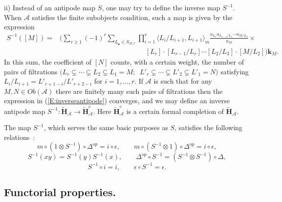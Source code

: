 \documentclass[a4paper,10pt]{amsart}
\def\H{\mathbf{H}}
\def\A{\mathcal{A}}
\numberwithin{equation}{section}
\begin{document}
\noindent
ii) Instead of an antipode map $S$, one may try to define the inverse map $S^{-1}$. When $\mathcal{A}$ satisfies the finite subobjects condition, such a map is given by the expression
\begin{equation}\label{E:inverseantipode}
\begin{split}
S^{-1}([M])=&\bigg( \sum_{r \geq 1} (-1)^r \sum_{\underline{L}_{\bullet} \in S_{M,r}} \prod_{i=1}^r \langle L_i/L_{i+1}, L_{i+1} \rangle_m \frac{a_{L_r} a_{L_{r-1}/L_r} \cdots a_{M/L_2}}{a_M} \times \\
&\qquad \qquad \qquad \qquad \qquad \qquad \; \;  [L_r] \cdot [L_{r-1}/L_r]  \cdots [L_2/L_3] \cdot [M/L_2] \bigg)\mathbf{k}_{M}.
\end{split}
\end{equation}
In this sum, the coefficient of $[N]$ counts, with a certain weight, the number of pairs of filtrations
$ \big( L_r \subsetneq \cdots \subsetneq L_2 \subsetneq L_1=M; \;\; L'_r \subsetneq \cdots \subsetneq L'_2 \subsetneq L'_1=N \big)$ satisfying $L_i/L_{i+1}=L'_{r+1-i}/L'_{r+2-i}$ for $i=1, \ldots, r$. If $\mathcal{A}$ is such that for any $M,N \in Ob(\mathcal{A})$ there are finitely many such pairs of filtrations then the expression in (\ref{E:inverseantipode}) converges, and we may define an inverse antipode map $S^{-1}: \widetilde{\H}_{\A} \to \widetilde{\H}_{\A}^{c}$. Here $\widetilde{\H}_{\A}^{c}$ is a certain formal completion of $\widetilde{\H}_{\A}$.

The map $S^{-1}$, which serves the same basic purposes as $S$, satisfies the following relations~:
\begin{equation*}
m \circ (1 \otimes S^{-1}) \circ {\Delta}^{op} = i \circ \epsilon, \qquad
m \circ (S^{-1} \otimes 1) \circ {\Delta}^{op} = i \circ \epsilon,
\end{equation*}
\begin{equation*}
S^{-1}(xy)=S^{-1}(y)S^{-1}(x), \qquad {\Delta}^{op} \circ S^{-1} = (S^{-1} \otimes S^{-1}) \circ {\Delta},
\end{equation*}
\begin{equation*}
S^{-1} \circ i=i, \qquad \epsilon \circ S^{-1}=\epsilon.
\end{equation*}

\newpage

\subsection{Functorial properties.}
\end{document}
